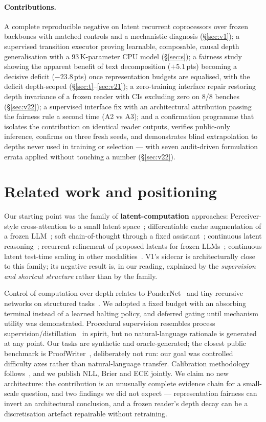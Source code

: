 \documentclass[11pt,a4paper]{article}
\begin{document}
\paragraph{Contributions.} A complete reproducible negative on latent recurrent coprocessors over frozen backbones with matched controls and a mechanistic diagnosis (\S\ref{sec:v1}); a supervised transition executor proving learnable, composable, causal depth generalisation with a 93\,K-parameter CPU model (\S\ref{sec:s}); a fairness study showing the apparent benefit of text decomposition ($+5.1$\,pts) becoming a decisive deficit ($-23.8$\,pts) once representation budgets are equalised, with the deficit depth-scoped (\S\ref{sec:t}--\ref{sec:v21}); a zero-training interface repair restoring depth invariance of a frozen reader with CIs excluding zero on 8/8 benches (\S\ref{sec:v22}); a supervised interface fix with an architectural attribution passing the fairness rule a second time (A2 vs A3); and a confirmation programme that isolates the contribution on identical reader outputs, verifies public-only inference, confirms on three fresh seeds, and demonstrates blind extrapolation to depths never used in training or selection --- with seven audit-driven formulation errata applied without touching a number (\S\ref{sec:v22}).

\section{Related work and positioning}

Our starting point was the family of \textbf{latent-computation} approaches: Perceiver-style cross-attention to a small latent space~\cite{perceiver}; differentiable cache augmentation of a frozen LLM~\cite{deliberation}; soft chain-of-thought through a fixed assistant~\cite{softcot}; continuous latent reasoning~\cite{coconut}; recurrent refinement of proposed latents for frozen LLMs~\cite{lrt}; continuous latent test-time scaling in other modalities~\cite{listen}. V1's sidecar is architecturally close to this family; its negative result is, in our reading, explained by the \emph{supervision and shortcut structure} rather than by the family.

Control of computation over depth relates to PonderNet~\cite{pondernet} and tiny recursive networks on structured tasks~\cite{tinyrec}. We adopted a fixed budget with an absorbing terminal instead of a learned halting policy, and deferred gating until mechanism utility was demonstrated. Procedural supervision resembles process supervision/distillation~\cite{system2} in spirit, but no natural-language rationale is generated at any point. Our tasks are synthetic and oracle-generated; the closest public benchmark is ProofWriter~\cite{proofwriter}, deliberately not run: our goal was controlled difficulty axes rather than natural-language transfer. Calibration methodology follows~\cite{calibration}, and we publish NLL, Brier and ECE jointly. We claim no new architecture: the contribution is an unusually complete evidence chain for a small-scale question, and two findings we did not expect --- representation fairness can invert an architectural conclusion, and a frozen reader's depth decay can be a discretisation artefact repairable without retraining.
\end{document}
